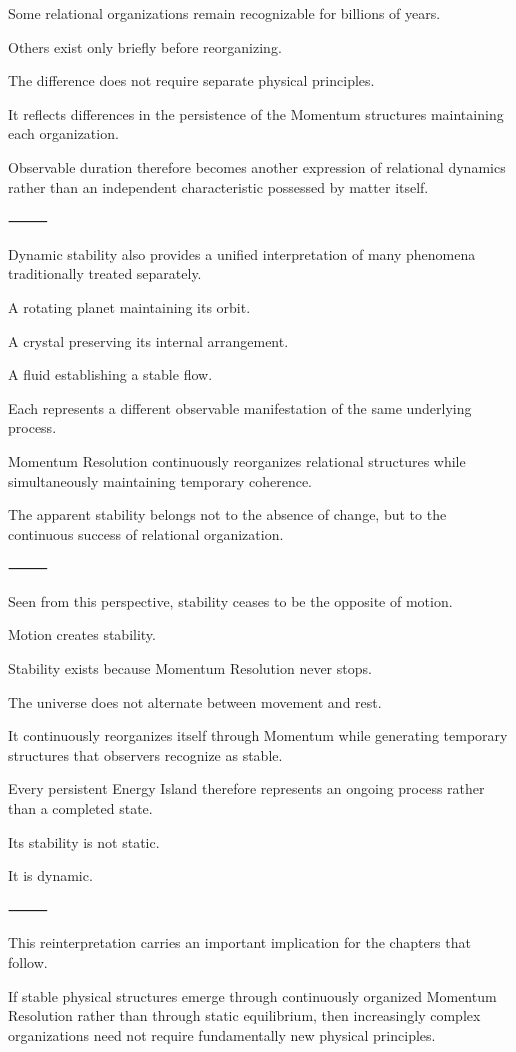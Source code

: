 Some relational organizations remain recognizable for billions of years.

Others exist only briefly before reorganizing.

The difference does not require separate physical principles.

It reflects differences in the persistence of the Momentum structures maintaining each organization.

Observable duration therefore becomes another expression of relational dynamics rather than an independent characteristic possessed by matter itself.

⸻

Dynamic stability also provides a unified interpretation of many phenomena traditionally treated separately.

A rotating planet maintaining its orbit.

A crystal preserving its internal arrangement.

A fluid establishing a stable flow.

Each represents a different observable manifestation of the same underlying process.

Momentum Resolution continuously reorganizes relational structures while simultaneously maintaining temporary coherence.

The apparent stability belongs not to the absence of change, but to the continuous success of relational organization.

⸻

Seen from this perspective, stability ceases to be the opposite of motion.

Motion creates stability.

Stability exists because Momentum Resolution never stops.

The universe does not alternate between movement and rest.

It continuously reorganizes itself through Momentum while generating temporary structures that observers recognize as stable.

Every persistent Energy Island therefore represents an ongoing process rather than a completed state.

Its stability is not static.

It is dynamic.

⸻

This reinterpretation carries an important implication for the chapters that follow.

If stable physical structures emerge through continuously organized Momentum Resolution rather than through static equilibrium, then increasingly complex organizations need not require fundamentally new physical principles.

